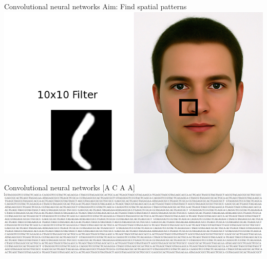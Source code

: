 \documentclass[Nike]{tuberlinbeamer}
\begin{document}

\begin{frame}{Convolutional neural networks}
  Aim: Find spatial patterns
  \pause
  \includegraphics[width=0.7\linewidth]{./nosefilter.png}
\end{frame}

\begin{frame}{Convolutional neural networks}
  \huge[A C A A]
  \pause
  \vspace{0.7cm}
  \includegraphics[width=\textwidth]{./manyguides.png}
\end{frame}
\end{document}
